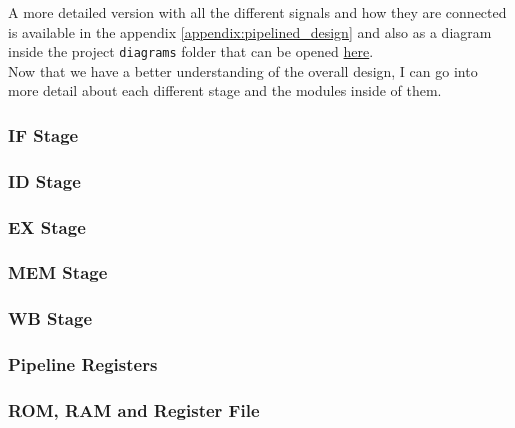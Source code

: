 A more detailed version with all the different signals and how they are connected is available in the appendix \ref{appendix:pipelined_design} and
also as a diagram inside the project \texttt{diagrams} folder that can be opened \href{https://app.diagrams.net/}{here}. \\

Now that we have a better understanding of the overall design, I can go into more detail about each different stage and the modules inside of them.

\subsubsection{IF Stage}



\subsubsection{ID Stage}





\subsubsection{EX Stage}



\subsubsection{MEM Stage}


\subsubsection{WB Stage}


\subsubsection{Pipeline Registers}


\subsubsection{ROM, RAM and Register File}











